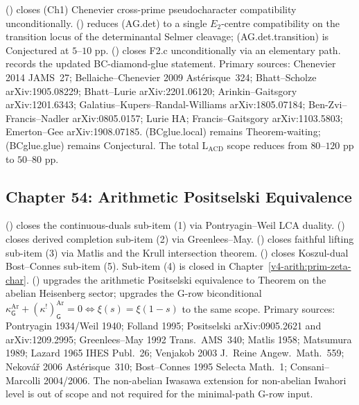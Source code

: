  (\ClaimStatusProvedHere)
closes (Ch1) Chenevier cross-prime pseudocharacter compatibility
unconditionally.
 (\ClaimStatusProvedHere)
reduces (AG.det) to a single \(E_{2}\)-centre compatibility on the
transition locus of the determinantal Selmer cleavage;
(AG.det.transition) is \(\mathrm{Conjectured}\) at \(5\)--\(10\) pp.
 (\ClaimStatusProvedHere)
closes F2.c unconditionally via an elementary path.
 records the updated
BC-diamond-glue statement.
Primary sources: Chenevier 2014 JAMS~27; Bellaiche--Chenevier 2009
Ast\'erisque~324; Bhatt--Scholze arXiv:1905.08229; Bhatt--Lurie
arXiv:2201.06120; Arinkin--Gaitsgory arXiv:1201.6343;
Galatius--Kupers--Randal-Williams arXiv:1805.07184;
Ben-Zvi--Francis--Nadler arXiv:0805.0157; Lurie HA;
Francis--Gaitsgory arXiv:1103.5803; Emerton--Gee arXiv:1908.07185.
(BCglue.local) remains Theorem-waiting; (BCglue.glue) remains
Conjectural. The total \(\mathrm{L}_{\mathrm{ACD}}\) scope reduces
from \(80\)--\(120\) pp to \(50\)--\(80\) pp.

\subsection{Chapter 54: Arithmetic Positselski Equivalence}
\label{v4-arith:w5-synth:ch54}

 (\ClaimStatusProvedHere)
closes the continuous-duals sub-item (1) via Pontryagin--Weil LCA
duality.
 (\ClaimStatusProvedHere)
closes derived completion sub-item (2) via Greenlees--May.
 (\ClaimStatusProvedHere)
closes faithful lifting sub-item (3) via Matlis and the Krull
intersection theorem.
 (\ClaimStatusProvedHere)
closes Koszul-dual Bost--Connes sub-item (5).
Sub-item (4) is closed in Chapter~\ref{v4-arith:prim-zeta-char}.
 (\ClaimStatusProvedHere)
upgrades the arithmetic Positselski equivalence to Theorem on the
abelian Heisenberg sector;
 upgrades the
G-row biconditional
\(\kappa^{\mathrm{Ar}}_{\mathsf{G}}+(\kappa^{!})^{\mathrm{Ar}}_{\mathsf{G}}=0
\Leftrightarrow\xi(s)=\xi(1-s)\)
to the same scope.
Primary sources: Pontryagin 1934/Weil 1940; Folland 1995;
Positselski arXiv:0905.2621 and arXiv:1209.2995;
Greenlees--May 1992 Trans.~AMS~340; Matlis 1958; Matsumura 1989;
Lazard 1965 IHES Publ.~26; Venjakob 2003 J.~Reine Angew.~Math.~559;
Nekov\'a\v{r} 2006 Ast\'erisque~310; Bost--Connes 1995
Selecta Math.~1; Consani--Marcolli 2004/2006.
The non-abelian Iwasawa extension for non-abelian Iwahori level is
out of scope and not required for the minimal-path G-row input.

